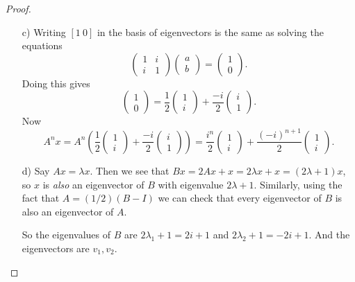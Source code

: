 \documentclass{article}
\theoremstyle{definition}
\begin{document}
\begin{proof}
\begin{itemize}
	\item[c)] Writing $[1 \ 0]$ in the basis of eigenvectors is the same as solving the equations 
	\[\begin{pmatrix}
		1 & i \\i & 1
	\end{pmatrix}\begin{pmatrix}
	a \\b
\end{pmatrix}= \begin{pmatrix}
1 \\0
\end{pmatrix}.\]
Doing this gives
\[\begin{pmatrix}
	1 \\0
\end{pmatrix}= \frac{1}{2}\begin{pmatrix}
1 \\i
\end{pmatrix}+ \frac{-i}{2}\begin{pmatrix}
i \\1
\end{pmatrix}.\]
Now 
\[A^n x= A^n\left(\frac{1}{2}\begin{pmatrix}
	1 \\i
\end{pmatrix}+ \frac{-i}{2}\begin{pmatrix}
	i \\1
\end{pmatrix}\right)= \frac{i^n}{2}\begin{pmatrix}
1 \\i
\end{pmatrix} + \frac{(-i)^{n+1}}{2}\begin{pmatrix}
1 \\i
\end{pmatrix}.\]
\item[d)] Say $Ax= \lambda x$. Then we see that $Bx= 2Ax+ x= 2 \lambda x+x=(2 \lambda +1)x$, so $x$ is \emph{also} an eigenvector of $B$ with eigenvalue $2 \lambda +1$. Similarly, using the fact that $A= (1/2)(B-I)$ we can check that every eigenvector of $B$ is also an eigenvector of $A$. 

So the eigenvalues of $B$ are $2 \lambda_1 +1=2i+1$ and $2 \lambda_2 +1= -2i +1.$ And the eigenvectors are $v_1, v_2$.
	\end{itemize}
\end{proof}
\end{document}
